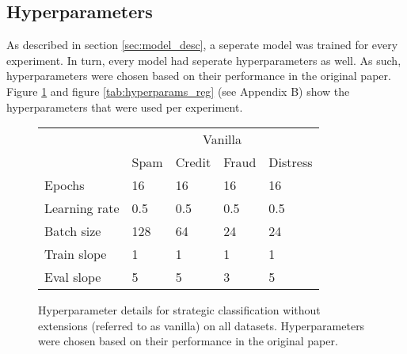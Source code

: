 \subsection{Hyperparameters}

As described in section \ref{sec:model_desc}, a seperate model was trained for every experiment. In turn, every model had seperate hyperparameters as well. As such, hyperparameters were chosen based on their performance in the original paper. Figure \ref{tab:hyperparams_vanilla} and figure \ref{tab:hyperparams_reg} (see Appendix B) show the hyperparameters that were used per experiment.
\begin{figure}[H]
    \centering
\begin{tabular}{l|llll|}
\cline{2-5}
                                    & \multicolumn{4}{c|}{Vanilla}                                                                   \\ \cline{2-5} 
                                    & \multicolumn{1}{l|}{Spam} & \multicolumn{1}{l|}{Credit} & \multicolumn{1}{l|}{Fraud} & Distress \\ \hline
\multicolumn{1}{|l|}{Epochs}        & \multicolumn{1}{l|}{16}     & \multicolumn{1}{l|}{16}       & \multicolumn{1}{l|}{16}    & 16   \\ \hline
\multicolumn{1}{|l|}{Learning rate} & \multicolumn{1}{l|}{0.5}    & \multicolumn{1}{l|}{0.5}      & \multicolumn{1}{l|}{0.5}   & 0.5  \\ \hline
\multicolumn{1}{|l|}{Batch size}    & \multicolumn{1}{l|}{128}     & \multicolumn{1}{l|}{64}       & \multicolumn{1}{l|}{24}    & 24  \\ \hline
\multicolumn{1}{|l|}{Train slope}   & \multicolumn{1}{l|}{1}      & \multicolumn{1}{l|}{1}        & \multicolumn{1}{l|}{1}     & 1    \\ \hline
\multicolumn{1}{|l|}{Eval slope}    & \multicolumn{1}{l|}{5}      & \multicolumn{1}{l|}{5}        & \multicolumn{1}{l|}{3}     & 5    \\ \hline
\end{tabular}
    \caption{Hyperparameter details for strategic classification without extensions (referred to as vanilla) on all datasets. Hyperparameters were chosen based on their performance in the original paper.}
    \label{tab:hyperparams_vanilla}
\end{figure}

